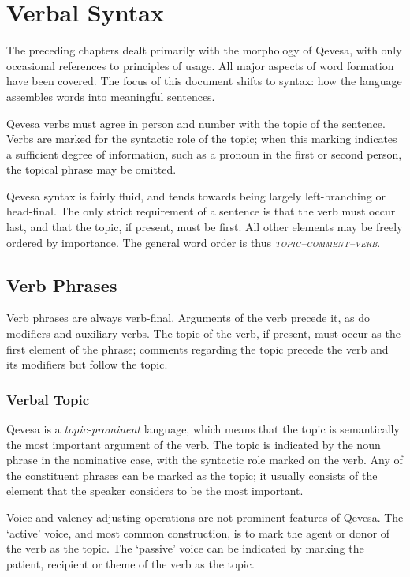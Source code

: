 \documentclass[grammar]{subfiles}
\begin{document}
	\chapter{Verbal Syntax}
	\label{ch:verbal-syntax}

	The preceding chapters dealt primarily with the morphology of Qevesa, with only occasional references to principles of usage. All major aspects of word formation have been covered. The focus of this document shifts to syntax: how the language assembles words into meaningful sentences.

	Qevesa verbs must agree in person and number with the topic of the sentence. Verbs are marked for the syntactic role of the topic; when this marking indicates a sufficient degree of information, such as a pronoun in the first or second person, the topical phrase may be omitted.

	Qevesa syntax is fairly fluid, and tends towards being largely left-branching or head-final. The only strict requirement of a sentence is that the verb must occur last, and that the topic, if present, must be first. All other elements may be freely ordered by importance. The general word order is thus \emph{\textsc{topic–comment–verb}}.

	\section{Verb Phrases}
	\label{sec:syn_verb_phrases}

	Verb phrases are always verb-final. Arguments of the verb precede it, as do modifiers and auxiliary verbs. The topic of the verb, if present, must occur as the first element of the phrase; comments regarding the topic precede the verb and its modifiers but follow the topic.

	\subsection{Verbal Topic}
	\label{ssec:syn_verbal_topic}

	Qevesa is a \emph{topic-prominent} language, which means that the topic is semantically the most important argument of the verb. The topic is indicated by the noun phrase in the nominative case, with the syntactic role marked on the verb. Any of the constituent phrases can be marked as the topic; it usually consists of the element that the speaker considers to be the most important.

	Voice and valency-adjusting operations are not prominent features of Qevesa. The ‘active’ voice, and most common construction, is to mark the agent or donor of the verb as the topic. The ‘passive’ voice can be indicated by marking the patient, recipient or theme of the verb as the topic.
\end{document}
